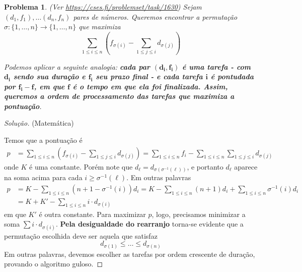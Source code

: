\documentclass{article}
\newtheorem{problem}{Problema}
\newenvironment{solutionenv}{\begin{adjustwidth}{0.25cm}{0.25cm}\begin{proof}[Solução]}{\end{proof}\end{adjustwidth}}
\begin{document}
\begin{problem} (Ver \url{https://cses.fi/problemset/task/1630})
  Sejam \((d_{1}, f_{1}), \dotsc (d_{n}, f_{n})\) pares de números. Queremos encontrar a permutação \(\sigma: \{1,\dotsc,n\} \to \{1,\dotsc,n\}\) que maximiza
  \[\sum_{1 \leq i \leq n}\left(f_{\sigma(i)} - \sum_{1 \leq j \leq i}d_{\sigma(j)}\right)\]

  Podemos aplicar a seguinte analogia: \textbf{cada par \(\mathbf{(d_{i}, f_{i})}\) é uma tarefa - com \(\mathbf{d_{i}}\) sendo sua duração e \(\mathbf{f_{i}}\) seu prazo final - e cada tarefa \(\mathbf{i}\) é pontudada por \(\mathbf{f_{i} - f}\), em que \(\mathbf{f}\) é o tempo em que ela foi finalizada. Assim, queremos a ordem de processamento das tarefas que maximiza a pontuação}.
\end{problem}
\begin{solutionenv} (Matemática)

  Temos que a pontuação é
  \begin{align*}
    p &= \sum_{1 \leq i \leq n}\left(f_{\sigma(i)} - \sum_{1 \leq j \leq i}d_{\sigma(j)}\right) = \sum_{1 \leq i \leq n}f_{i} - \sum_{1 \leq i \leq n}\sum_{1 \leq j \leq i}d_{\sigma(j)}
  \end{align*}
  onde \(K\) é uma constante. Porém note que \(d_{\ell} = d_{\sigma(\sigma^{-1}(\ell))}\), e portanto \(d_{\ell}\) aparece na soma acima para cada \(i \geq \sigma^{-1}(\ell)\). Em outras palavras
  \begin{align*}
    p &= K - \sum_{1 \leq i \leq n}(n + 1 - \sigma^{-1}(i))d_{i} = K - \sum_{1 \leq i \leq n}(n + 1)d_{i} + \sum_{1 \leq i \leq n}\sigma^{-1}(i)d_{i}
    \\
    &= K + K' - \sum_{1 \leq i \leq n}i\cdot d_{\sigma(i)}
  \end{align*}
  em que \(K'\) é outra constante. Para maximizar \(p\), logo, precisamos minimizar a soma \(\sum i\cdot d_{\sigma(i)}\). \textbf{Pela desigualdade do rearranjo} torna-se evidente que a permutação escolhida deve ser aquela que satisfaz
  \[d_{\sigma(1)} \leq \dotsc \leq d_{\sigma(n)}\]
  Em outras palavras, devemos escolher as tarefas por ordem crescente de duração, provando o algoritmo guloso.
\end{solutionenv}
\end{document}
